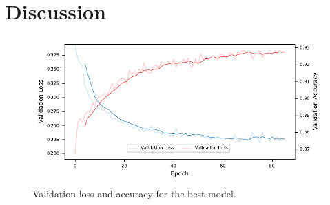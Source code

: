 


\section{Discussion}
\label{discussion}

\begin{figure}[H]
    \centering
    \captionsetup{width=0.8\linewidth}
    \includegraphics{figures/best_model_training_metrics.pdf}
    \caption{Validation loss and accuracy for the best model.}
    \label{fig:best_model_training_metrics}
\end{figure}